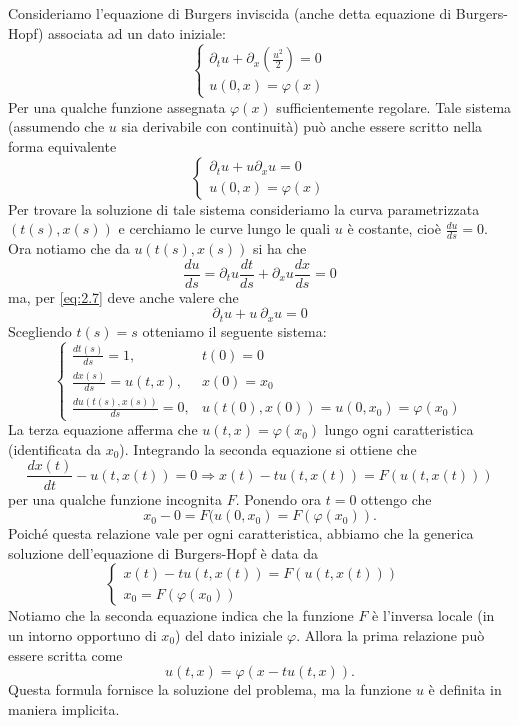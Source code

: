 Consideriamo l'equazione di Burgers inviscida (anche detta equazione di Burgers-Hopf) associata ad un dato iniziale:
\begin{equation}\label{eq:2.7}
    \begin{cases}
        \partial_{t}u + \partial_{x}(\frac{u^{2}}{2}) = 0\\
        u(0,x) = \varphi(x)
    \end{cases}
\end{equation}
Per una qualche funzione assegnata $\varphi(x)$ sufficientemente regolare. Tale sistema (assumendo che $u$ sia derivabile con continuità) può anche essere scritto nella forma equivalente
\begin{equation}\label{eq:2.8}
    \begin{cases}
        \partial_{t}u + u\partial_{x}u = 0\\
        u(0,x) = \varphi(x)
    \end{cases}
\end{equation}
Per trovare la soluzione di tale sistema consideriamo la curva parametrizzata $(t(s), x(s))$ e cerchiamo le curve lungo le quali $u$ è costante, cioè $\frac{du}{ds}=0$. Ora notiamo che da $u(t(s),x(s))$ si ha che
$$\frac{du}{ds} = \partial_{t}u\frac{dt}{ds} + \partial_{x}u\frac{dx}{ds}=0$$
ma, per \eqref{eq:2.7} deve anche valere che 
$$\partial_{t}u + u \ \partial_{x}u = 0$$
Scegliendo $t(s) = s$ otteniamo il seguente sistema:
\begin{equation}\label{eq:2.9}
    \begin{cases}
        \frac{dt(s)}{ds} = 1, & t(0) = 0 \\
        \frac{dx(s)}{ds} = u(t,x), & x(0) = x_{0} \\
        \frac{du(t(s),x(s))}{ds} = 0, & u(t(0),x(0)) = u(0,x_{0}) = \varphi(x_{0})
    \end{cases}
\end{equation}
La terza equazione afferma che $u(t,x) = \varphi(x_{0})$ lungo ogni caratteristica (identificata da $x_{0}$). Integrando la seconda equazione si ottiene che
$$\frac{dx(t)}{dt}-u(t,x(t)) = 0 \Longrightarrow x(t)-tu(t,x(t))=F(u(t,x(t)))$$
per una qualche funzione incognita $F$. Ponendo ora $t=0$ ottengo che 
$$x_{0}-0=F(u(0,x_{0})=F(\varphi(x_{0})).$$
Poiché questa relazione vale per ogni caratteristica, abbiamo che la generica soluzione dell'equazione di Burgers-Hopf è data da
\begin{equation}\label{eq:2.10}
    \begin{cases}
        x(t)-tu(t,x(t))=F(u(t,x(t)))&\\
        x_{0}=F(\varphi(x_{0}))&
    \end{cases}
\end{equation}
Notiamo che la seconda equazione indica che la funzione $F$ è l'inversa locale (in un intorno opportuno di $x_{0}$) del dato iniziale $\varphi$. Allora la prima relazione può essere scritta come
\begin{equation}\label{eq:2.11}
u(t,x) = \varphi(x-tu(t,x)).
\end{equation}
Questa formula fornisce la soluzione del problema, ma la funzione $u$ è definita in maniera implicita.

